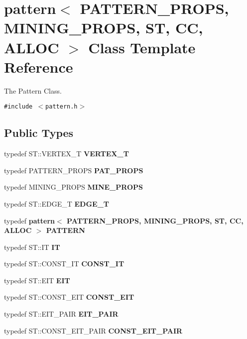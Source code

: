 \section{pattern$<$ PATTERN\_\-PROPS, MINING\_\-PROPS, ST, CC, ALLOC $>$ Class Template Reference}
\label{classpattern}
The Pattern Class.  


{\tt \#include $<$pattern.h$>$}

\subsection*{Public Types}
\begin{CompactItemize}
\item 
typedef ST::VERTEX\_\-T \textbf{VERTEX\_\-T}\label{classpattern_79d0fa4194aa35d3e20728e5767b8be9}

\item 
typedef PATTERN\_\-PROPS \textbf{PAT\_\-PROPS}\label{classpattern_c4f3c0ad49bf3aaeb224acf7a57e47bf}

\item 
typedef MINING\_\-PROPS \textbf{MINE\_\-PROPS}\label{classpattern_1a2d83f1b54d9e8263650f54b27c860a}

\item 
typedef ST::EDGE\_\-T \textbf{EDGE\_\-T}\label{classpattern_e682ee55a6bcf28cb46a02d1ee87478d}

\item 
typedef \bf{pattern}$<$ PATTERN\_\-PROPS, MINING\_\-PROPS, ST, CC, ALLOC $>$ \textbf{PATTERN}\label{classpattern_fcd65ca77eab7ba904db6ab9c45c4e43}

\item 
typedef ST::IT \textbf{IT}\label{classpattern_90fef547fece6c182e489ddb1eac33c9}

\item 
typedef ST::CONST\_\-IT \textbf{CONST\_\-IT}\label{classpattern_8c74d80d3160b889a9438a297efcffec}

\item 
typedef ST::EIT \textbf{EIT}\label{classpattern_de7f072768ac14cf78024f908b2eea19}

\item 
typedef ST::CONST\_\-EIT \textbf{CONST\_\-EIT}\label{classpattern_a2a3de65a7e3c13a4dba0b83701d7602}

\item 
typedef ST::EIT\_\-PAIR \textbf{EIT\_\-PAIR}\label{classpattern_e23177d0b12f0fe955e4351172e550c7}

\item 
typedef ST::CONST\_\-EIT\_\-PAIR \textbf{CONST\_\-EIT\_\-PAIR}\label{classpattern_649c857da9383c71d8924ae31073a656}


\end{CompactItemize}
